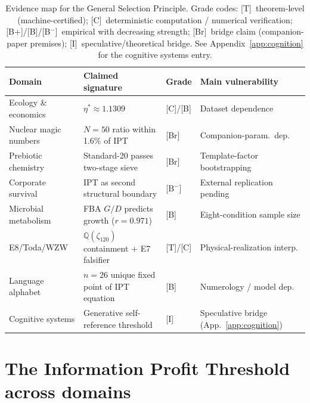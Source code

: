 \documentclass[11pt]{article}
\theoremstyle{remark}
\begin{document}
\begin{table}[ht]
\centering
\caption{Evidence map for the General Selection Principle.
Grade codes: [T]~theorem-level (machine-certified); [C]~deterministic computation / numerical verification;
[B+]/[B]/[B$^-$]~empirical with decreasing strength; [Br]~bridge claim (companion-paper premises); [I]~speculative/theoretical bridge.
See Appendix~\ref{app:cognition} for the cognitive systems entry.}
\label{tab:evidence_map}
\small
\begin{tabular}{@{}p{3.4cm}p{4.8cm}p{1.0cm}p{3.5cm}@{}}
\toprule
\textbf{Domain} & \textbf{Claimed signature} & \textbf{Grade} & \textbf{Main vulnerability} \\
\midrule
Ecology \& economics & $\eta^* \approx 1.1309$ & [C]/[B] & Dataset dependence \\
Nuclear magic numbers & $N=50$ ratio within 1.6\% of IPT & [Br] & Companion-param.\ dep. \\
Prebiotic chemistry & Standard-20 passes two-stage sieve & [Br] & Template-factor bootstrapping \\
Corporate survival & IPT as second structural boundary & [B$^-$] & External replication pending \\
Microbial metabolism & FBA $G/D$ predicts growth ($r=0.971$) & [B] & Eight-condition sample size \\
E8/Toda/WZW & $\mathbb{Q}(\zeta_{120})$ containment + E7 falsifier & [T]/[C] & Physical-realization interp.\\
Language alphabet & $n=26$ unique fixed point of IPT equation & [B] & Numerology / model dep. \\
Cognitive systems & Generative self-reference threshold & [I] & Speculative bridge (App.~\ref{app:cognition}) \\
\bottomrule
\end{tabular}
\end{table}

\section{The Information Profit Threshold across domains}
\label{sec:ipt}
\end{document}
